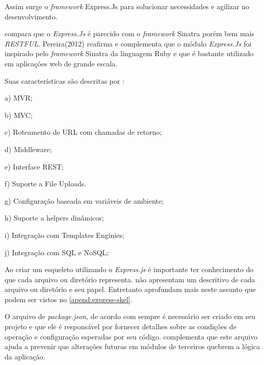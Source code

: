   Assim surge o \textit{framework} Express.Js para solucionar necessidades e agilizar no desenvolvimento.
  
   compara que o \textit{Express.Js} é parecido com o \textit{framework} Sinatra porém bem mais \textit{RESTFUL}. 
  Pereira(2012) reafirma e complementa que o módulo \textit{Express.Js} foi inspirado pelo \textit{framework} Sinatra da 
  linguagem Ruby e que é bastante utilizado em aplicações web de grande escala.
  
  Suas características são descritas por :
  
  \begin{compactitem}
    \item[a)] \ac{MVR};   
    
    \item[b)] \ac{MVC};
    
    \item[c)] Roteamento de \ac{URL} com chamadas de retorno;
    
    \item[d)] Middleware;
    
    \item[e)] Interface \ac{REST};
    
    \item[f)] Suporte a File Uploads.
    
    \item[g)] Configuração baseada em variáveis de ambiente;
    
    \item[h)] Suporte a helpers dinâmicos;
    
    \item[i)] Integração com Templates Enginies;
    
    \item[j)] Integração com SQL e NoSQL;
    
  \end{compactitem}
  
  Ao criar um esqueleto utilizando o \textit{Express.js} é importante ter conhecimento do que cada
  arquivo ou diretório representa. \cite{Powers:2012, Hughes:2012} não apresentam um descritivo de cada arquivo 
  ou diretório e seu papel. Entretanto \cite{Pereira:2013, Wilson:2013} aprofundam mais neste assunto que podem ser vistos
  no \ref{apend:express-skel}.
  
  O arquivo de \textit{package.json}, de acordo com  sempre é necessário ser criado 
  em seu projeto e que ele é responsável por fornecer detalhes sobre as condições de operação e configuração 
  esperadas por seu código. \cite{Wilson:2013} complementa que este arquivo ajuda a prevenir que alterações 
  futuras em módulos de terceiros quebrem a lógica da aplicação.


